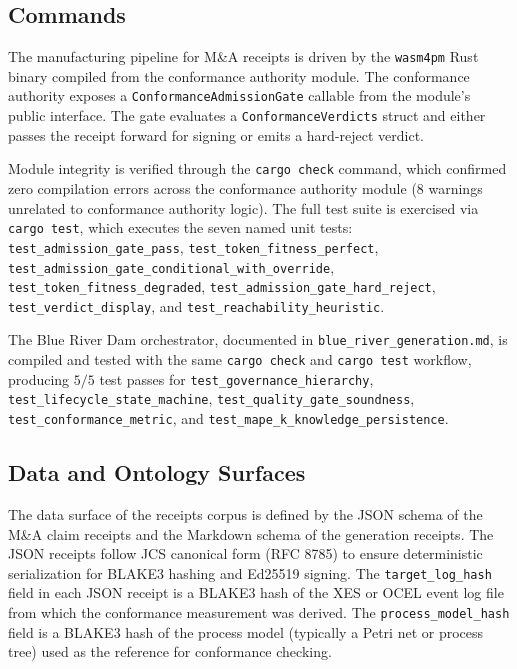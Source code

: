 \subsection{Commands}
\label{sec:receipts-implementation-commands}

The manufacturing pipeline for M\&A receipts is driven by the \texttt{wasm4pm} Rust binary
compiled from the conformance authority module. The conformance authority exposes a
\texttt{ConformanceAdmissionGate} callable from the module's public interface. The
gate evaluates a \texttt{ConformanceVerdicts} struct and either passes the receipt
forward for signing or emits a hard-reject verdict.

Module integrity is verified through the \texttt{cargo check} command, which confirmed
zero compilation errors across the conformance authority module (8 warnings unrelated to
conformance authority logic). The full test suite is exercised via \texttt{cargo test},
which executes the seven named unit tests: \texttt{test\_admission\_gate\_pass},
\texttt{test\_token\_fitness\_perfect}, \texttt{test\_admission\_gate\_conditional\_with\_override},
\texttt{test\_token\_fitness\_degraded}, \texttt{test\_admission\_gate\_hard\_reject},
\texttt{test\_verdict\_display}, and \texttt{test\_reachability\_heuristic}.

The Blue River Dam orchestrator, documented in \texttt{blue\_river\_generation.md}, is compiled
and tested with the same \texttt{cargo check} and \texttt{cargo test} workflow, producing
$5/5$ test passes for \texttt{test\_governance\_hierarchy}, \texttt{test\_lifecycle\_state\_machine},
\texttt{test\_quality\_gate\_soundness}, \texttt{test\_conformance\_metric}, and
\texttt{test\_mape\_k\_knowledge\_persistence}.

\subsection{Data and Ontology Surfaces}
\label{sec:receipts-implementation-data}

The data surface of the receipts corpus is defined by the JSON schema of the M\&A claim
receipts and the Markdown schema of the generation receipts. The JSON receipts follow
JCS canonical form (RFC 8785) to ensure deterministic serialization for BLAKE3 hashing
and Ed25519 signing. The \texttt{target\_log\_hash} field in each JSON receipt is a
BLAKE3 hash of the XES or OCEL event log file from which the conformance measurement
was derived. The \texttt{process\_model\_hash} field is a BLAKE3 hash of the process
model (typically a Petri net or process tree) used as the reference for conformance checking.

